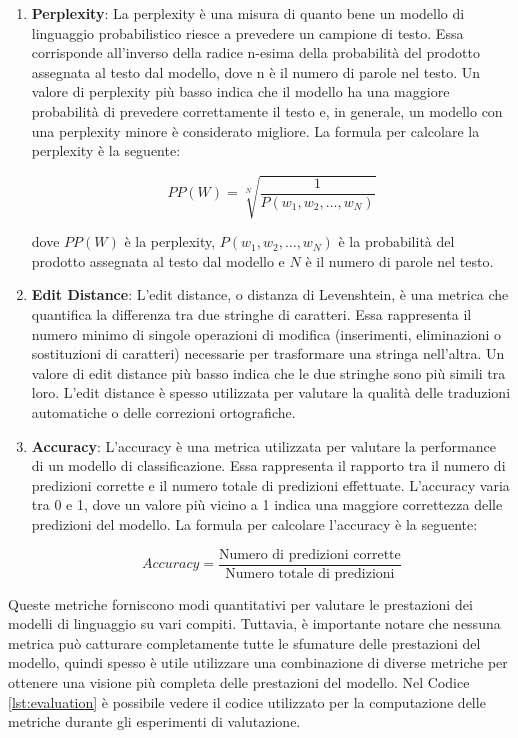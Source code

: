 \begin{enumerate}[label=\alph*.]

  \item \textbf{Perplexity}: La perplexity è una misura di quanto bene un modello di linguaggio probabilistico riesce a prevedere un campione di testo. Essa corrisponde all'inverso della radice n-esima della probabilità del prodotto assegnata al testo dal modello, dove n è il numero di parole nel testo. Un valore di perplexity più basso indica che il modello ha una maggiore probabilità di prevedere correttamente il testo e, in generale, un modello con una perplexity minore è considerato migliore. La formula per calcolare la perplexity è la seguente:

\[PP(W) = \sqrt[N]{\frac{1}{P(w_1,w_2,\dots,w_N)}}\]

dove $PP(W)$ è la perplexity, $P(w_1,w_2,\dots,w_N)$ è la probabilità del prodotto assegnata al testo dal modello e $N$ è il numero di parole nel testo.

  \item \textbf{Edit Distance}: L'edit distance, o distanza di Levenshtein, è una metrica che quantifica la differenza tra due stringhe di caratteri. Essa rappresenta il numero minimo di singole operazioni di modifica (inserimenti, eliminazioni o sostituzioni di caratteri) necessarie per trasformare una stringa nell'altra. Un valore di edit distance più basso indica che le due stringhe sono più simili tra loro. L'edit distance è spesso utilizzata per valutare la qualità delle traduzioni automatiche o delle correzioni ortografiche.

  \item \textbf{Accuracy}: L'accuracy è una metrica utilizzata per valutare la performance di un modello di classificazione. Essa rappresenta il rapporto tra il numero di predizioni corrette e il numero totale di predizioni effettuate. L'accuracy varia tra 0 e 1, dove un valore più vicino a 1 indica una maggiore correttezza delle predizioni del modello. La formula per calcolare l'accuracy è la seguente:

\[Accuracy = \frac{\text{Numero di predizioni corrette}}{\text{Numero totale di predizioni}}\]

\end{enumerate}   

Queste metriche forniscono modi quantitativi per valutare le prestazioni dei modelli di linguaggio su vari compiti. Tuttavia, è importante notare che nessuna metrica può catturare completamente tutte le sfumature delle prestazioni del modello, quindi spesso è utile utilizzare una combinazione di diverse metriche per ottenere una visione più completa delle prestazioni del modello. Nel Codice \ref{lst:evaluation} è possibile vedere il codice utilizzato per la computazione delle metriche durante gli esperimenti di valutazione.



